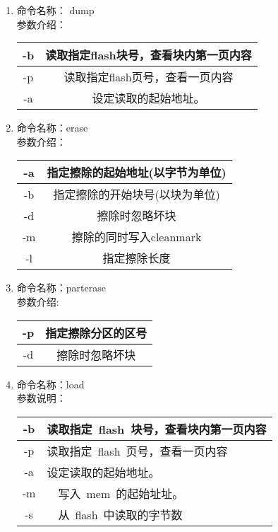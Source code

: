\begin{enumerate}
\item 命令名称： dump\\
参数介绍：
\begin{table}[htbp]
\setlength{\parindent}{0pt}
\begin{tabular}{|c|c|}
\hline
 -b &  读取指定flash块号，查看块内第一页内容	\\ \hline
 -p &  读取指定flash页号，查看一页内容\\ \hline
 -a &  设定读取的起始地址。\\ \hline
\end{tabular}
\end{table}
\pagebreak[4]

\item 命令名称：erase\\
参数介绍：
\begin{table}[htbp]
\setlength{\parindent}{0pt}
\begin{tabular}{|c|c|}
\hline
  -a &    指定擦除的起始地址(以字节为单位)\\ \hline
  -b &   指定擦除的开始块号(以块为单位) \\ \hline
  -d &   擦除时忽略坏块 \\ \hline
  -m &    擦除的同时写入cleanmark\\ \hline
  -l &   指定擦除长度 \\ \hline
\end{tabular}
\end{table}

\item 命令名称：parterase \\
参数介绍:
\begin{table}[htbp]
\centering
\begin{tabular}{|c|c|}
\hline
 -p &   指定擦除分区的区号 \\ \hline
 -d &    擦除时忽略坏块\\ \hline
\end{tabular}
\end{table}

\item 命令名称：load \\
参数说明：
\begin{tabular}{|c|l|}
\hline
 -b &  读取指定~flash~块号，查看块内第一页内容	\\ \hline
 -p &  读取指定~flash~页号，查看一页内容\\ \hline
 -a &  设定读取的起始地址。\\ \hline
 -m &　写入~mem~的起始址址。\\ \hline
 -s &　从~flash~中读取的字节数\\ \hline
\end{tabular}
\end{enumerate}

